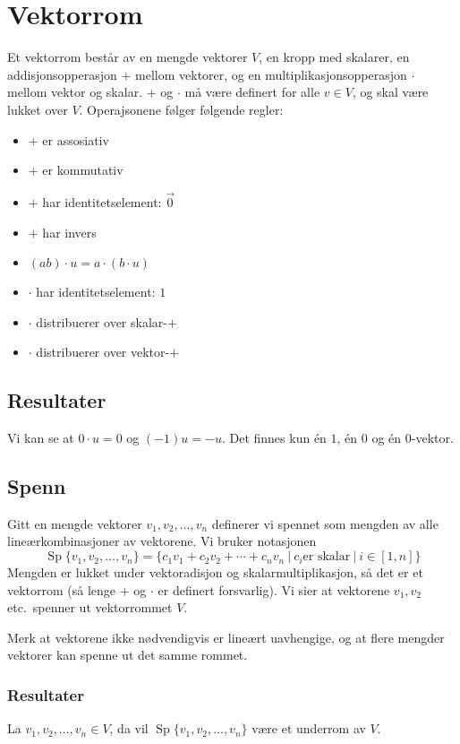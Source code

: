 \documentclass[12pt,a4paper,norsk]{article}
\DeclareMathOperator{\Sp}{Sp} %
\begin{document}
\section{Vektorrom}
Et vektorrom består av en mengde vektorer $V$, en kropp med skalarer, en
addisjonsopperasjon $+$ mellom vektorer, og en multiplikasjonsopperasjon $\cdot$
mellom vektor og skalar. $+$ og $\cdot$ må være definert for alle $v \in V$, og skal
være lukket over $V$. 
Operajsonene følger følgende regler:
\begin{multicols}{2}
\begin{itemize}
  \setlength{\itemsep}{0em}
  \item $+$ er assosiativ
  \item $+$ er kommutativ
  \item $+$ har identitetselement: $\vec{0}$
  \item $+$ har invers
  \item $(ab) \cdot u = a \cdot (b \cdot u)$
  \item $\cdot$ har identitetselement: $1$
  \item $\cdot$ distribuerer over skalar-$+$
  \item $\cdot$ distribuerer over vektor-$+$
\end{itemize}
\end{multicols}

\subsection{Resultater}
Vi kan se at $0 \cdot u = 0$ og $(-1)u = -u$.
Det finnes kun én $1$, én $0$ og én $0$-vektor.

\subsection{Spenn}
Gitt en mengde vektorer $v_{1}, v_{2}, \ldots, v_{n}$ definerer vi spennet som
mengden av alle lineærkombinasjoner av vektorene. Vi bruker notasjonen
\[\Sp\{v_{1}, v_{2}, \ldots, v_{n}\} = \{c_{1}v_{1} + c_{2}v_{2} + \cdots + c_{n}v_{n}\ |\ c_{i} \text{
    er skalar}\ |\ i \in [1,n]\}\]
Mengden er lukket under vektoradisjon og
skalarmultiplikasjon, så det er et vektorrom (så lenge $+$ og $\cdot$ er definert
forsvarlig). Vi sier at vektorene $v_{1},v_{2}$ etc.\ spenner ut vektorrommet
$V$.

Merk at vektorene ikke nødvendigvis er lineært uavhengige, og at flere
mengder vektorer kan spenne ut det samme rommet.

\subsubsection{Resultater}
La $v_{1}, v_{2}, \ldots, v_{n} \in V$, da vil $\Sp\{v_{1}, v_{2}, \ldots, v_{n}\}$ være et
underrom av $V$.
\end{document}
